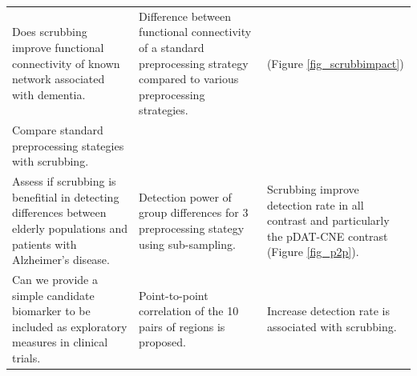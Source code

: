 \documentclass[authoryear]{elsarticle}
\begin{document}
\begin{landscape}
\begin{table}[tbp]
\begin{center}
\begin{tabular}{p{6cm}p{6cm}p{10cm}}
   \\Does scrubbing improve functional connectivity of known network associated with dementia. & Difference between functional connectivity of a standard preprocessing strategy compared to various preprocessing strategies. &  (Figure \ref{fig_scrubbimpact})
   
   \\Compare standard preprocessing stategies with scrubbing. &
   
   \\Assess if scrubbing is benefitial in detecting differences between elderly populations and patients with Alzheimer's disease. & Detection power of group differences for 3 preprocessing stategy using sub-sampling. & Scrubbing improve detection rate in all contrast and particularly the pDAT-CNE contrast (Figure \ref{fig_p2p}).
   
   \\ Can we provide a simple candidate biomarker to be included as exploratory measures in clinical trials. & Point-to-point correlation of the 10 pairs of regions is proposed. & Increase detection rate is associated with scrubbing.
  
  
    

\end{tabular}
\end{center}
\end{table}
\end{landscape}
\end{document}
